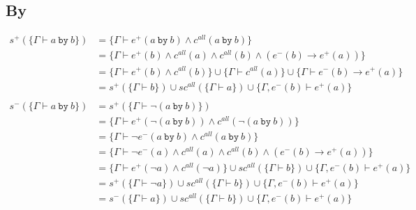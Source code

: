 \documentclass[12pt]{article}
\newcommand{\by}{~\texttt{by}~}
\begin{document}
\subsection*{By}
\begin{align*}
  s^+ (\{\Gamma \vdash a \by b\})      & = \{\Gamma \vdash e^+(a \by b) \land c^{all}(a \by b)\}                                                                         \\
                                       & = \{\Gamma \vdash e^+(b) \land c^{all}(a) \land c^{all} (b) \land (e^-(b) \rightarrow e^+(a))\}                                 \\
                                       & = \{\Gamma \vdash e^+(b) \land c^{all}(b)\} \cup \{\Gamma \vdash c^{all} (a)\} \cup \{\Gamma \vdash e^-(b) \rightarrow e^+(a)\} \\
                                       & = s^+(\{\Gamma \vdash b \}) \cup sc^{all}(\{\Gamma \vdash a\}) \cup \{\Gamma, e^-(b) \vdash e^+(a)\}                            \\
  \\
  s^- (\{\Gamma \vdash a \by b\})      & = s^+ (\{\Gamma \vdash \neg (a \by b)\})                                                                                        \\
                                       & = \{\Gamma \vdash e^+(\neg (a \by b)) \land c^{all}(\neg (a \by b))\}                                                           \\
                                       & = \{\Gamma \vdash \neg e^-(a \by b) \land c^{all}(a \by b)\}                                                                    \\
                                       & = \{\Gamma \vdash \neg e^-(a) \land c^{all}(a) \land c^{all} (b) \land (e^-(b) \rightarrow e^+(a))\}                            \\
                                       & = \{\Gamma \vdash e^+(\neg a) \land c^{all}(\neg a)\} \cup sc^{all}(\{\Gamma \vdash b\}) \cup \{\Gamma, e^-(b) \vdash e^+(a)\}  \\
                                       & = s^+(\{\Gamma \vdash \neg a\}) \cup sc^{all}(\{\Gamma \vdash b\}) \cup \{\Gamma, e^-(b) \vdash e^+(a)\}                        \\
                                       & = s^-(\{\Gamma \vdash a\}) \cup sc^{all}(\{\Gamma \vdash b\}) \cup \{\Gamma, e^-(b) \vdash e^+(a)\}                             \\

\end{align*}
\end{document}
